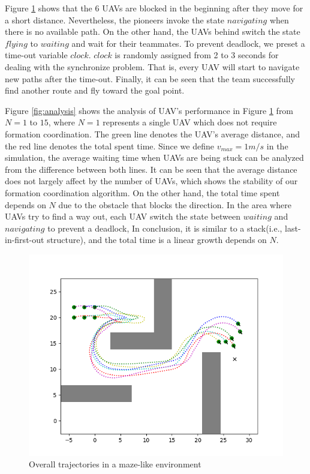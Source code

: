 Figure \ref{fig:maze} shows that the 6 UAVs are blocked in the beginning after they move for a short distance. Nevertheless, the pioneers invoke the state $navigating$ when there is no available path. On the other hand, the UAVs behind switch the state $flying$ to $waiting$ and wait for their teammates. To prevent deadlock, we preset a time-out variable $clock$. $clock$ is randomly assigned from 2 to 3 seconds for dealing with the synchronize problem. That is, every UAV will start to navigate new paths after the time-out. Finally, it can be seen that the team successfully find another route and fly toward the goal point.

Figure \ref{fig:analysis} shows the analysis of UAV's performance in Figure \ref{fig:maze} from $N = 1$ to $15$, where $N=1$ represents a single UAV which does not require formation coordination. The green line denotes the UAV's average distance, and the red line denotes the total spent time. Since we define $v_{max} = 1m/s$ in the simulation, the
average waiting time when UAVs are being stuck can be analyzed from the difference between both lines. It can be seen that the average distance does not largely affect by the number of UAVs, which shows the stability of our formation coordination algorithm. On the other hand, the total time spent depends on $N$ due to the obstacle that blocks the direction. In the area where UAVs try to find a way out, each UAV switch the state between $waiting$ and $navigating$ to prevent a deadlock, In conclusion, it is similar to a stack(i.e., last-in-first-out structure), and the total time is a linear growth depends on $N$.


\begin{figure}[H]
    \centering
    \includegraphics[scale=1]{figures/comprehensive_simulation_2.png}
    \caption{Overall trajectories in a maze-like environment}
    \label{fig:maze}
\end{figure}

